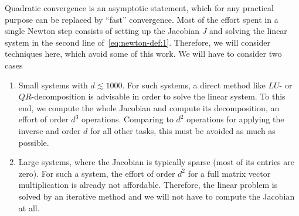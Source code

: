 \begin{intro}
  Quadratic convergence is an asymptotic statement, which for any
  practical purpose can be replaced by ``fast'' convergence. Most of
  the effort spent in a single Newton step consists of setting up the
  Jacobian $J$ and solving the linear system in the second line
  of~\eqref{eq:newton-def:1}. Therefore, we will consider techniques
  here, which avoid some of this work. We will have to consider two
  cases
  \begin{enumerate}
  \item Small systems with $d\lesssim 1000$. For such systems, a
    direct method like $LU$- or $QR$-decomposition is advisable in
    order to solve the linear system. To this end, we compute the
    whole Jacobian and compute its decomposition, an effort of order
    $d^3$ operations. Comparing to $d^2$ operations for applying the
    inverse and order $d$ for all other tasks, this must be avoided as
    much as possible.
  \item Large systems, where the Jacobian is typically sparse (most of
    its entries are zero). For such a system, the effort of order
    $d^2$ for a full matrix vector multiplication is already not
    affordable. Therefore, the linear problem is solved by an
    iterative method and we will not have to compute the Jacobian at
    all.
  \end{enumerate}
\end{intro}

